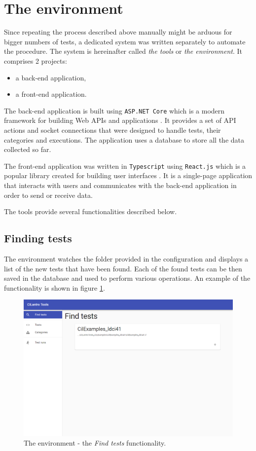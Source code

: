 \documentclass[declaration,shortabstract,english,mgr]{iithesis}
\begin{document}
\section{The environment}
\label{sec:environment}

Since repeating the process described above manually might be arduous for bigger numbers of tests, a dedicated system was written separately to automate the procedure. The system is hereinafter called \textit{the tools} or \textit{the environment}. It comprises 2 projects:
\begin{itemize}
	\item{a back-end application,}
	\item{a front-end application.}
\end{itemize}

The back-end application is built using \texttt{ASP.NET Core} which is a modern framework for building Web APIs and applications \cite{littleAsp}. It provides a set of API actions and socket connections that were designed to handle tests, their categories and executions. The application uses a database to store all the data collected so far.

The front-end application was written in \texttt{Typescript} using \texttt{React.js} which is a popular library created for building user interfaces \cite{learningReact}. It is a single-page application that interacts with users and communicates with the back-end application in order to send or receive data.

The tools provide several functionalities described below.

\subsection{Finding tests}

The environment watches the folder provided in the configuration and displays a list of the new tests that have been found. Each of the found tests can be then saved in the database and used to perform various operations. An example of the functionality is shown in figure \ref{fig:tools_find}.

\begin{figure}
	\includegraphics[width=1\textwidth]{tools_find.png}
    \centering
    \caption{The environment - the \textit{Find tests} functionality.}
    \label{fig:tools_find}
\end{figure}
\end{document}
